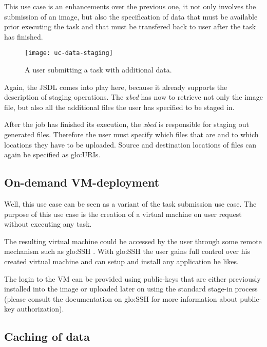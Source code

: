 This  use case  is an  enhancements  over the  previous one,  it not  only
involves the  submission of an image,  but also the  specification of data
that  must  be  available  prior  executing  the task  and  that  must  be
transfered back to user after the task has finished.

\begin{figure}[htbp]
  \begin{center}
    \texttt{[image: uc-data-staging]}
  \end{center}
  \caption[UC  Data  Staging]{A user  submitting  a  task with  additional
    data.}
  \label{fig:uc-data-staging}
\end{figure}

Again,  the JSDL comes  into play  here, because  it already  supports the
description of staging operations. The \emph{xbed} has now to retrieve not
only  the image  file, but  also  all the  additional files  the user  has
specified to be staged in.

After the job  has finished its execution, the  \emph{xbed} is responsible
for staging  out generated  files. Therefore the  user must  specify which
files that are and to which locations they have to be uploaded. Source and
destination locations of files can again be specified as \gls{glo:URI}s.

\subsection{On-demand VM-deployment}
\label{sec:uc-on-demand-vm-deployment}

Well, this use  case can be seen  as a variant of the  task submission use
case. The purpose of this use case is the creation of a virtual machine on
user request without executing any task.

The resulting virtual  machine could be accessed by  the user through some
remote mechanism such as \gls{glo:SSH} \cite{openssh}.  With \gls{glo:SSH}
the user gains full control over his created virtual machine and can setup
and install any application he likes.

The login  to the  VM can  be provided using  public-keys that  are either
previously  installed  into the  image  or  uploaded  later on  using  the
standard   stage-in   process  (please   consult   the  documentation   on
\gls{glo:SSH} for more information about public-key authorization).


\subsection{Caching of data}
\label{sec:uc-data-caching}


